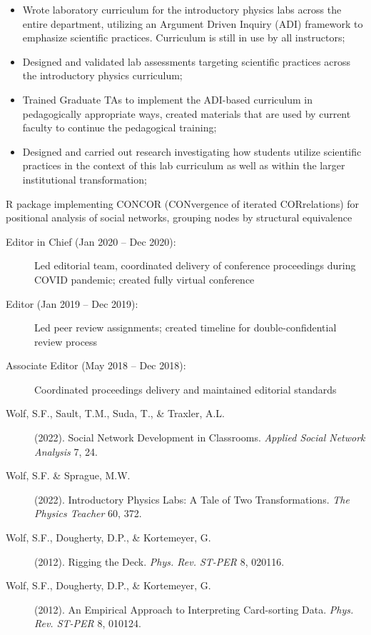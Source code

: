 \documentclass[10pt,letterpaper,ragged2e,withhyper,normalphoto]{altacv}
\begin{document}
\begin{itemize}
\item Wrote laboratory curriculum for the introductory physics labs
  across the entire department, utilizing an Argument Driven Inquiry
  (ADI) framework to emphasize scientific practices. Curriculum is
  still in use by all instructors;
\item Designed and validated lab assessments targeting scientific
  practices across the introductory physics curriculum;
\item Trained Graduate TAs to implement the ADI-based curriculum in
  pedagogically appropriate ways, created materials that are used by
  current faculty to continue the pedagogical training;
\item Designed and carried out research investigating how students
  utilize scientific practices in the context of this lab curriculum
  as well as within the larger institutional transformation;
\end{itemize}

 R package implementing CONCOR (CONvergence of
iterated CORrelations) for positional analysis of social networks,
grouping nodes by structural equivalence

\begin{description}
\item[Editor in Chief (Jan 2020 -- Dec 2020):] Led editorial team,
  coordinated delivery of conference proceedings during COVID
  pandemic; created fully virtual conference
\item[Editor (Jan 2019 -- Dec 2019):] Led peer review assignments;
  created timeline for double-confidential review process
\item[Associate Editor (May 2018 -- Dec 2018):] Coordinated
  proceedings delivery and maintained editorial standards
\end{description}


\begin{description}
\item[Wolf, S.F., Sault, T.M., Suda, T., \& Traxler, A.L.]
  (2022). Social Network Development in Classrooms. \textit{Applied
    Social Network Analysis} 7, 24.
\item[Wolf, S.F. \& Sprague, M.W.] (2022). Introductory Physics Labs:
  A Tale of Two Transformations. \textit{The Physics Teacher} 60, 372.
\item[Wolf, S.F., Dougherty, D.P., \& Kortemeyer, G.] (2012). Rigging
  the Deck. \textit{Phys. Rev. ST-PER} 8, 020116.
\item[Wolf, S.F., Dougherty, D.P., \& Kortemeyer, G.] (2012). An
  Empirical Approach to Interpreting Card-sorting
  Data. \textit{Phys. Rev. ST-PER} 8, 010124.
\end{description}
\end{document}
